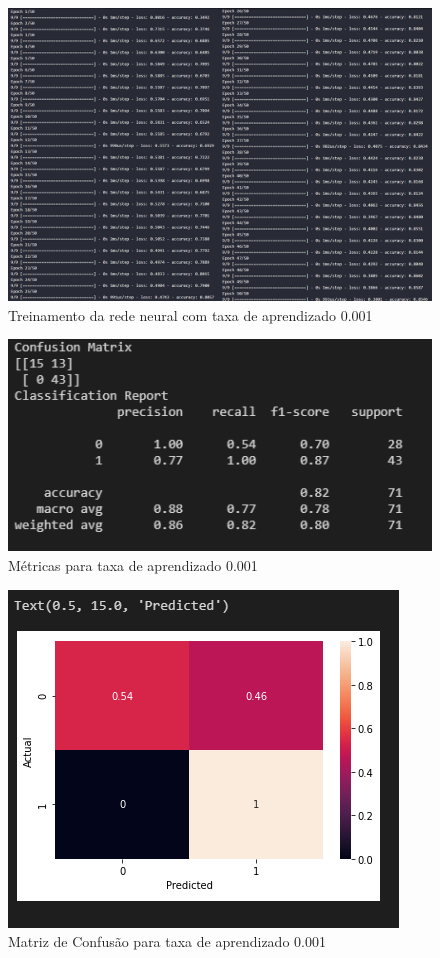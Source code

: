 \documentclass[12pt]{article}
\begin{document}
\begin{figure}[H]
	\centering
	\includegraphics[width=1.1\linewidth]{Imagens/taxa0001/fittaxa0001}
	\caption{Treinamento da rede neural com taxa de aprendizado 0.001}
	\label{fig:fittaxa0001}
\end{figure}
\begin{figure}[H]
	\centering
	\includegraphics[width=0.7\linewidth]{Imagens/taxa0001/metricastaxa0001}
	\caption{Métricas para taxa de aprendizado 0.001}
	\label{fig:metricastaxa0001}
\end{figure}
\begin{figure}[H]
	\centering
	\includegraphics[width=0.7\linewidth]{Imagens/taxa0001/confusaotaxa0001}
	\caption{Matriz de Confusão para taxa de aprendizado 0.001}
	\label{fig:confusaotaxa0001}
\end{figure}
\end{document}
